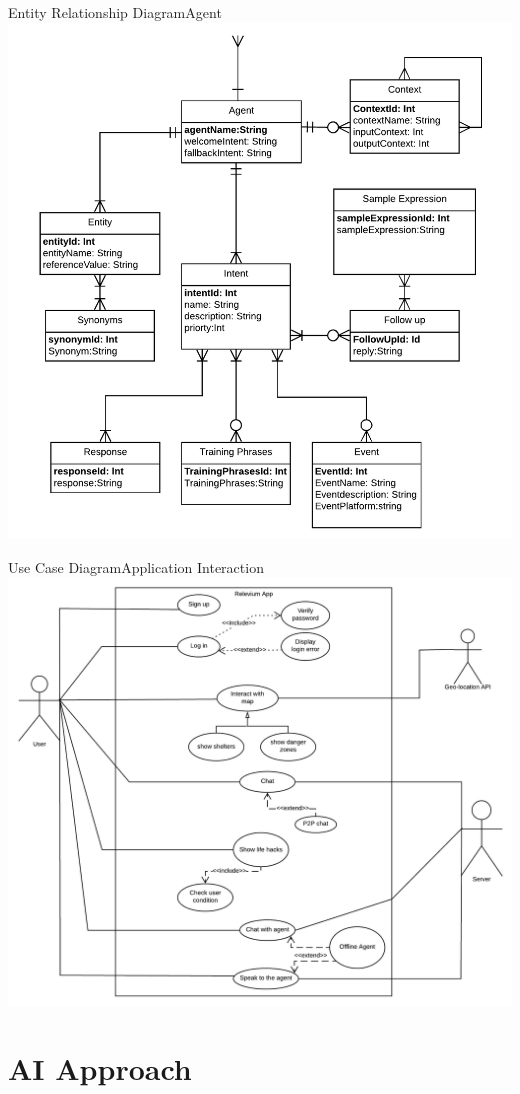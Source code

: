 \documentclass{beamer}
\begin{document}
\begin{frame}{Entity Relationship Diagram}{Agent}
    \centering\includegraphics[width=.78\linewidth]{img2/erd2.pdf}
\end{frame}

\begin{frame}{Use Case Diagram}{Application Interaction}
    \centering\includegraphics[width=.85\linewidth]{img3/UseCaseDiagram1.pdf}
\end{frame}


\section{AI Approach}
\end{document}
